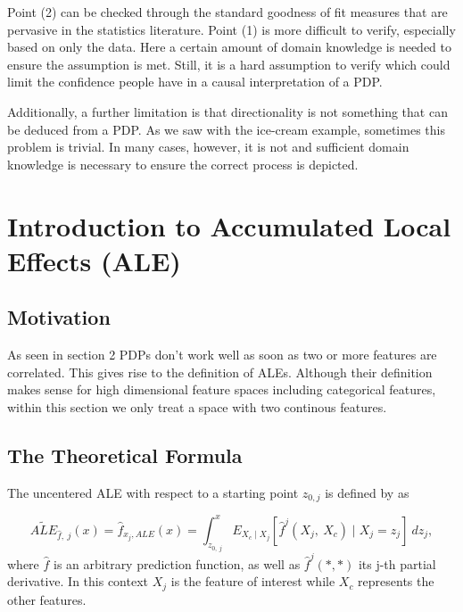 \documentclass[
]{krantz}
\begin{document}
Point (2) can be checked through the standard goodness of fit measures that are pervasive in the statistics literature. Point (1) is more difficult to verify, especially based on only the data. Here a certain amount of domain knowledge is needed to ensure the assumption is met. Still, it is a hard assumption to verify which could limit the confidence people have in a causal interpretation of a PDP.

Additionally, a further limitation is that directionality is not something that can be deduced from a PDP. As we saw with the ice-cream example, sometimes this problem is trivial. In many cases, however, it is not and sufficient domain knowledge is necessary to ensure the correct process is depicted.

\hypertarget{introduction-to-accumulated-local-effects-ale}{%
\chapter{Introduction to Accumulated Local Effects (ALE)}\label{introduction-to-accumulated-local-effects-ale}}

\hypertarget{motivation}{%
\section{Motivation}\label{motivation}}

As seen in section 2 PDPs don't work well as soon as two or more features are correlated. This gives rise to the definition of ALEs. Although their definition makes sense for high dimensional feature spaces including categorical features, within this section we only treat a space with two continous features.

\hypertarget{ale-intro-formula}{%
\section{The Theoretical Formula}\label{ale-intro-formula}}

The uncentered ALE with respect to a starting point \(z_{0, j}\) is defined by \citep{Apley2016} as

\[  \widetilde{ALE}_{\hat{f},~j}(x) = \hat{f}_{x_j,ALE}(x) = \int_{z_{0,~j}}^{x} E_{X_c \mid X_j} [\hat{f}^j(X_j,~X_c)\mid X_j = z_j]~dz_j,\]
where \(\hat{f}\) is an arbitrary prediction function, as well as \(\hat{f}^j(*,*)\) its j-th partial derivative. In this context \(X_j\) is the feature of interest while \(X_c\) represents the other features.
\end{document}
